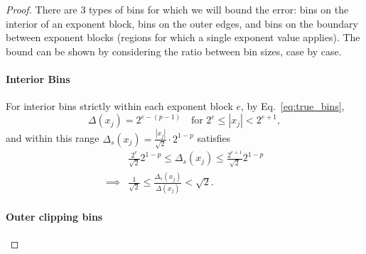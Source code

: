 \documentclass[12pt,onecolumn, margin=1in]{IEEEtran}
\begin{document}
\begin{proof}

There are 3 types of bins for which we will bound the error: bins on the interior of an exponent block, bins on the outer edges, and bins on the boundary between exponent blocks (regions for which a single exponent value applies). The bound can be shown by considering the ratio between bin sizes, case by case.

\paragraph{Interior Bins}
For interior bins strictly within each exponent block $e$, by Eq.~\eqref{eq:true_bins},
\begin{equation}
    \label{eq:real_bins}
    \Delta(x_j) = 2^{e-(p-1)} \quad \text{for } 2^e \leq |x_j| < 2^{e+1},
\end{equation}
and within this range $\Delta_s(x_j) = \frac{|x_j|}{\sqrt{2}} \cdot 2^{1-p}$ satisfies
\begin{equation}
    \begin{aligned}
    &\frac{2^e}{\sqrt{2}}2^{1-p} \leq \Delta_s(x_j) \leq \frac{2^{e+1}}{\sqrt{2}}2^{1-p}\\
    \implies &\frac{1}{\sqrt{2}} \leq \frac{\Delta_s(x_j)}{\Delta(x_j)} < \sqrt{2}.
    \end{aligned}
\end{equation}

\paragraph{Outer clipping bins}


\end{proof}
\end{document}
